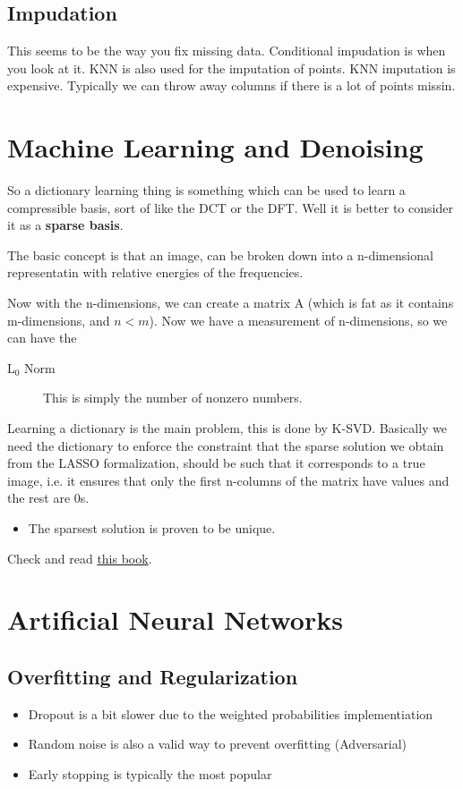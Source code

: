 \documentclass[12pt,a4paper,oneside,headinclude]{scrartcl}
\numberwithin{figure}{section}
\numberwithin{equation}{section}
\numberwithin{table}{section}
\begin{document}
\subsection{Impudation}
\label{sec:org821984f}
This seems to be the way you fix missing data. Conditional impudation is when
you look at it. KNN is also used for the imputation of points. KNN imputation is
expensive. Typically we can throw away columns if there is a lot of points missin.
\section{Machine Learning and Denoising}
\label{sec:orgf233cc2}
So a dictionary learning thing is something which can be used to learn a
compressible basis, sort of like the DCT or the DFT. Well it is better to
consider it as a \textbf{sparse basis}.

The basic concept is that an image, can be broken down into a n-dimensional
representatin with relative energies of the frequencies.

Now with the n-dimensions, we can create a matrix A (which is fat as it contains
m-dimensions, and \(n<m\)). Now we have a measurement of n-dimensions, so we can
have the

\begin{description}
\item[{L\(_{\text{0}}\) Norm}] This is simply the number of nonzero numbers.
\end{description}

Learning a dictionary is the main problem, this is done by K-SVD. Basically we
need the dictionary to enforce the constraint that the sparse solution we obtain
from the LASSO formalization, should be such that it corresponds to a true
image, i.e. it ensures that only the first n-columns of the matrix have values
and the rest are 0s.

\begin{itemize}
\item The sparsest solution is proven to be unique.
\end{itemize}
Check and read \href{https://link.springer.com/book/10.1007\%252F978-1-4419-7011-4}{this book}.
\section{Artificial Neural Networks}
\label{sec:org030609e}
\subsection{Overfitting and Regularization}
\label{sec:orgc5cbe9b}
\begin{itemize}
\item Dropout is a bit slower due to the weighted probabilities implementiation
\item Random noise is also a valid way to prevent overfitting (Adversarial)
\item Early stopping is typically the most popular
\end{itemize}
\end{document}
